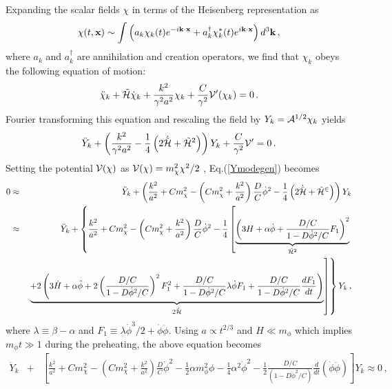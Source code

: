 \documentclass[aps,prd,amsmath,amssymb,preprintnumbers,onecolumn,11pt,nofootinbib]{revtex4}
\begin{document}
Expanding the scalar fields $\chi$ in terms of the Heisenberg representation as
\begin{eqnarray}
\chi(t,{\bf x}) \sim \int \left(a_{k}\chi_{k}(t)e^{-i{\bf k}\cdot{\bf x}} + a^{\dagger}_{k}\chi^{*}_{k}(t)e^{i{\bf k}\cdot{\bf x}}\right)d^{3}{\bf k} \,, \label{kspace}
\end{eqnarray}
where $a_{k}$ and $a^{\dagger}_{k}$ are annihilation and creation operators, we find that $\chi_{k}$ obeys the following equation of motion:
\begin{eqnarray}
\ddot{\chi}_{k}+{\tilde {\cal H}}\dot{\chi}_{k} +\frac{k^{2}}{\gamma^{2}a^{2}}\chi_{k}+\frac{C}{\gamma^{2}}{\cal V}'(\chi_{k}) = 0\,. \label{kmode}
\end{eqnarray}
Fourier transforming this equation and rescaling the field by $Y_{k} = {\cal A}^{1/2}\chi_{k}$ yields
\begin{eqnarray}
\ddot{Y}_{k} + \left(\frac{k^{2}}{\gamma^{2}a^{2}} 
- \frac 14 \left(2{\dot{\tilde{\cal H}}} + {\tilde{\cal H}}^{2} \right)\right) Y_{k} 
+\frac{C}{\gamma^{2}}{\cal V}' = 0\,.
\label{Ymodegen}
\end{eqnarray}
Setting the potential ${\cal V}(\chi)$ as ${\cal V}(\chi)=m^{2}_{\chi}\chi^{2} / 2$ ,
Eq.(\ref{Ymodegen}) becomes
\begin{eqnarray}
0 &\approx&
\ddot{Y}_{k} + \left(\frac{k^{2}}{a^{2}} +Cm^{2}_{\chi} - \left(C m^{2}_{\chi} + \frac{k^{2}}{a^{2}}\right)\frac{D}{C} {\dot \phi}^{2}
- \frac 14 \left(2 \dot{{\tilde {\cal H}}} + {\tilde {\cal H}}^{2}\right)\right) Y_{k}
\nonumber\\
&\approx&
\ddot{Y}_{k} + \left\{\frac{k^{2}}{a^{2}} +Cm^{2}_{\chi} - \left(C m^{2}_{\chi} + \frac{k^{2}}{a^{2}}\right)\frac{D}{C}{\dot \phi}^{2}
- \frac 14 \left[\underbrace{
\left(3 H + \alpha \dot\phi 
+ \frac{D/C}{1 - D\dot\phi^2/C}F_1
\right)^2
}_{{\tilde {\cal H}}^{2}}
\right.\right.
\nonumber\\
&&\left.\left.
\underbrace{
+ 2\left(3 \dot H + \alpha \ddot\phi
+ 2 \left(\frac{D/C}{1 - D \dot\phi^2 /C}\right)^2F_1^2
+ \frac{D/C}{1 - D \dot\phi^2 / C} \lambda\dot\phi F_1 
+ \frac{D/C}{1 - D \dot\phi^2 / C} \frac{dF_1}{dt} 
\right)
}_{2 \dot{{\tilde {\cal H}}}}
\right]\right\} Y_{k}\,,
\label{DCcont0}
\end{eqnarray}
where $\lambda \equiv \beta - \alpha$ and $F_1 \equiv \lambda \dot\phi^3 / 2 + \dot\phi\ddot\phi$.
Using $a \propto t^{2/3}$ and $H \ll m_{\phi}$ which implies $m_\phi t \gg 1$ during the preheating,
the above equation becomes
\begin{eqnarray}
\ddot{Y}_{k} &+& \left[\frac{k^{2}}{a^{2}} + C m^{2}_{\chi} - \left(C m^{2}_{\chi} + \frac{k^{2}}{a^{2}}\right)\frac{D}{C}{\dot \phi}^{2}
- \frac 12 \alpha m_\phi^2 \phi
- \frac 14 \alpha^2 \dot\phi^2
- \frac 12\frac{D/C}{(1 - D \dot\phi^2/C)} \frac{d}{dt} \left(\dot\phi\ddot\phi\right)\right] Y_{k}
\approx 0\,,
\label{DCcont}
\end{eqnarray}
\end{document}
